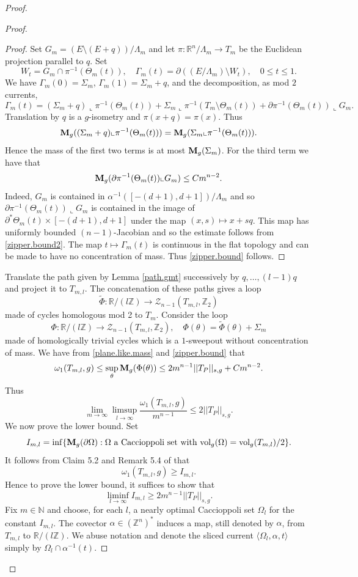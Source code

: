 \documentclass[11pt]{amsart}
\def\R{\mathbb R}
\def\N{\mathbb N}
\def\Z{\mathbb Z}
\def\vol{\mathrm{vol}}
\theoremstyle{remark}
\theoremstyle{definition}
\begin{document}
\begin{proof}
\begin{proof}
\begin{proof}
				Set $G_m=(E\setminus(E+q))/\Lambda_m$ and let $\pi:\R^n/\Lambda_m\to T_m$ be the Euclidean projection parallel to $q$. Set 
				$$
				W_t=G_m\cap\pi^{-1}(\Theta_m(t)),\quad \Gamma_m(t)=\partial((E/\Lambda_m)\setminus W_t),\quad 0\leq t\leq1.
				$$
				We have $\Gamma_m(0)=\Sigma_m$, $\Gamma_m(1)=\Sigma_m+q$, and the decomposition, as mod $2$ currents,
				$$\Gamma_m(t)=(\Sigma_m+q)\llcorner \pi^{-1}(\Theta_m(t))+\Sigma_m\llcorner \pi^{-1}(T_m\setminus\Theta_m(t))+\partial \pi^{-1}(\Theta_m(t))\llcorner G_m.$$
				Translation by $q$ is a $g$-isometry and $\pi(x+q)=\pi(x)$.  Thus  
				$${\bf M}_g((\Sigma_m+q)\llcorner \pi^{-1}(\Theta_m(t)))={\bf M}_g(\Sigma_m\llcorner \pi^{-1}(\Theta_m(t))).$$ Hence the mass of the first two terms is at most ${\bf M}_g(\Sigma_m)$. For the third term we have that
				$${\bf M}_g(\partial \pi^{-1}(\Theta_m(t))\llcorner G_m)\leq Cm^{n-2}.$$
				Indeed, $G_m$ is contained in $\alpha^{-1}([-(d+1),d+1])/\Lambda_m$ and so  $\partial \pi^{-1}(\Theta_m(t))\llcorner G_m$ is contained in the image of $\partial^*\Theta_m(t)\times[-(d+1),d+1]$ under the map $(x,s)\mapsto x+sq$. This map has uniformly bounded $(n-1)$-Jacobian and so the estimate follows from  \eqref{zipper.bound2}. The map $t\mapsto \Gamma_m(t)$ is continuous in the flat topology and can be made to have no concentration of mass. Thus \eqref{zipper.bound} follows.
			\end{proof}
			{Translate the path given by Lemma \ref{path.gmt}} successively by $q,\ldots,(l-1)q$ and project it to $T_{m,l}$. The concatenation of these paths gives  a  loop  
			$$\tilde \Phi:\R/(l\Z)\rightarrow \mathcal Z_{n-1}(T_{m,l},\Z_2)$$
			made of cycles homologous mod 2 to $T_m$. Consider the loop 
			{$$ \Phi:\R/(l\Z)\rightarrow \mathcal Z_{n-1}(T_{m,l},\Z_2), \quad \Phi(\theta)=\tilde\Phi(\theta)+\Sigma_m$$}
			made of homologically trivial cycles which is a $1$-sweepout without concentration of mass. We have from  \eqref{plane.like.mass} and \eqref{zipper.bound} that
			$$
			\omega_1(T_{m,l},g)\leq\sup_{\theta}{\bf M}_g(\Phi(\theta))\leq 2m^{n-1}||T_P||_{s,g}+Cm^{n-2}.
			$$
			Thus
			$$\lim_{m\to\infty}\limsup_{l\to\infty}\frac{\omega_1(T_{m,l},g)}{m^{n-1}}\leq 2||T_P||_{s,g}.$$
			We now prove the lower bound. Set
			$$I_{m,l}=\inf \{{\bf M}_g(\partial \Omega):\Omega\text{ a Caccioppoli set with }\vol_g(\Omega)=\vol_g(T_{m,l})/2\}.$$
			It follows from Claim 5.2 and Remark 5.4 of \cite{mnindex} that
			$$
			\omega_1(T_{m,l},g)\geq I_{m,l}.
			$$
			Hence to prove the lower bound, it suffices to show that
			\begin{equation}\label{long.isoperimetric}
				\liminf_{l\to\infty}I_{m,l}\geq 2m^{n-1}||T_P||_{s,g}.
			\end{equation}
			Fix $m\in\N$ and choose, for each $l$, a nearly optimal  Caccioppoli set $\Omega_l$ for the constant $I_{m,l}$.  The covector $\alpha\in (\Z^n)^*$ induces a map, still denoted by $\alpha$, from $T_{m,l}$ to $\R/(l\Z)$.  We abuse notation and denote the sliced current $\langle \Omega_l, \alpha,t\rangle$ simply by $\Omega_l\cap \alpha^{-1}(t)$.
			

\end{proof}
\end{proof}
\end{document}
